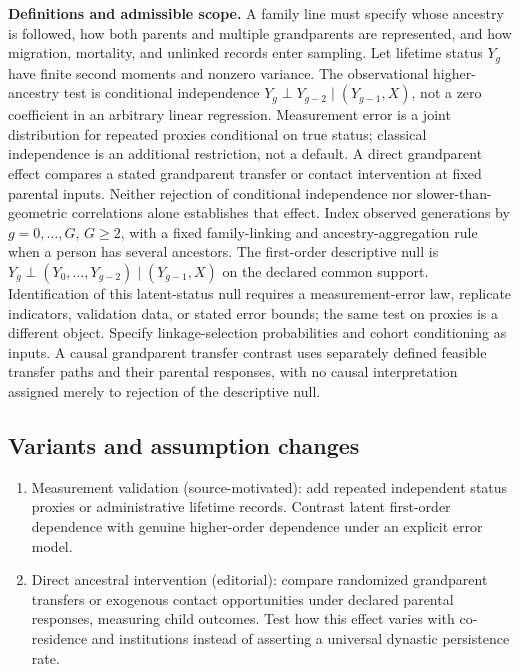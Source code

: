 \documentclass[11pt,a4paper]{article}
\begin{document}
\textbf{Definitions and admissible scope.} A family line must specify whose ancestry is followed, how both parents and multiple grandparents are represented, and how migration, mortality, and unlinked records enter sampling. Let lifetime status \(Y_g\) have finite second moments and nonzero variance. The observational higher-ancestry test is conditional independence \(Y_g\mathrel{\perp}Y_{g-2}\mid(Y_{g-1},X)\), not a zero coefficient in an arbitrary linear regression. Measurement error is a joint distribution for repeated proxies conditional on true status; classical independence is an additional restriction, not a default. A direct grandparent effect compares a stated grandparent transfer or contact intervention at fixed parental inputs. Neither rejection of conditional independence nor slower-than-geometric correlations alone establishes that effect. Index observed generations by \(g=0,\ldots,G\), \(G\ge2\), with a fixed family-linking and ancestry-aggregation rule when a person has several ancestors. The first-order descriptive null is \(Y_g\mathrel{\perp}(Y_0,\ldots,Y_{g-2})\mid(Y_{g-1},X)\) on the declared common support. Identification of this latent-status null requires a measurement-error law, replicate indicators, validation data, or stated error bounds; the same test on proxies is a different object. Specify linkage-selection probabilities and cohort conditioning as inputs. A causal grandparent transfer contrast uses separately defined feasible transfer paths and their parental responses, with no causal interpretation assigned merely to rejection of the descriptive null.
\subsection*{Variants and assumption changes}
\begin{enumerate}
\item Measurement validation (source-motivated): add repeated independent status proxies or administrative lifetime records. Contrast latent first-order dependence with genuine higher-order dependence under an explicit error model.
\item Direct ancestral intervention (editorial): compare randomized grandparent transfers or exogenous contact opportunities under declared parental responses, measuring child outcomes. Test how this effect varies with co-residence and institutions instead of asserting a universal dynastic persistence rate.
\end{enumerate}
\end{document}
